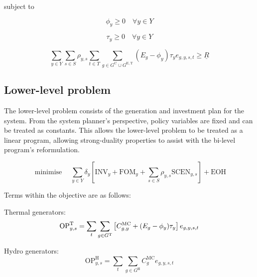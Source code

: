 \documentclass{article}
\newcommand{\sGeneratorsExistingThermal}{G^{\mathrm{E,T}}}
\newcommand{\sGeneratorsCandidate}{G^{\mathrm{C}}}
\newcommand{\sGeneratorsThermal}{G^{\mathrm{T}}}
\newcommand{\sGeneratorsHydro}{G^{\mathrm{H}}}
\newcommand{\sYears}{Y}
\newcommand{\sScenarios}{S}
\newcommand{\sIntervals}{T}
\newcommand{\iGenerator}{g}
\newcommand{\iYear}{y}
\newcommand{\iScenario}{s}
\newcommand{\iInterval}{t}
\newcommand{\cOperatingCostThermal}[1][\iYear,\iScenario]{\mathrm{OP}^{\mathrm{T}}_{#1}}
\newcommand{\cOperatingCostHydro}[1][\iYear,\iScenario]{\mathrm{OP}^{\mathrm{H}}_{#1}}
\newcommand{\cFixedOperationsMaintenanceCost}[1][\iYear]{\mathrm{FOM}_{#1}}
\newcommand{\cScenarioDuration}[1][\iYear,\iScenario]{\rho_{#1}}
\newcommand{\cMarginalCost}[1][\iGenerator,\iYear]{C^{\mathrm{MC}}_{#1}}
\newcommand{\cEmissionsIntensity}[1][\iGenerator]{E_{#1}}
\newcommand{\cInvestmentCost}[1][\iYear]{\mathrm{INV}_{#1}}
\newcommand{\cOperatingCostScenario}[1][\iYear,\iScenario]{\mathrm{SCEN}_{#1}}
\newcommand{\cDiscountRate}[1][\iYear]{\delta_{#1}}
\newcommand{\vBaseline}[1][\iYear]{\phi_{#1}}
\newcommand{\vPermitPrice}[1][\iYear]{\tau_{#1}}
\newcommand{\vEnergy}[1][\iGenerator,\iYear,\iScenario,\iInterval]{e_{#1}}
\newcommand{\cMinimumSchemeRevenue}{\underline{R}}
\newcommand{\cEndOfHorizonCost}{\textrm{EOH}}
\DeclareMathOperator*{\minimise}{minimise}
\begin{document}
subject to

\begin{equation}
	\vBaseline \geq 0 \quad \forall \iYear \in \sYears
\end{equation}

\begin{equation}
	\vPermitPrice \geq 0 \quad \forall \iYear \in \sYears
\end{equation}

\begin{equation}
	\sum\limits_{\iYear \in \sYears} \sum\limits_{\iScenario \in \sScenarios} \cScenarioDuration \sum\limits_{\iInterval \in \sIntervals} \sum\limits_{\iGenerator \in \sGeneratorsCandidate \cup \sGeneratorsExistingThermal}\left(\cEmissionsIntensity -\vBaseline\right)\vPermitPrice \vEnergy \geq \cMinimumSchemeRevenue
\end{equation}

\subsection{Lower-level problem}
The lower-level problem consists of the generation and investment plan for the system. From the system planner's perspective, policy variables are fixed and can be treated as constants. This allows the lower-level problem to be treated as a linear program, allowing strong-duality properties to assist with the bi-level program's reformulation.

\begin{equation}
	\minimise \quad \sum\limits_{\iYear\in\sYears} \cDiscountRate \left[\cInvestmentCost + \cFixedOperationsMaintenanceCost + \sum\limits_{\iScenario \in \sScenarios} \cScenarioDuration \cOperatingCostScenario \right] + \cEndOfHorizonCost
\end{equation}

Terms within the objective are as follows:

Thermal generators:
\begin{equation}
	\cOperatingCostThermal = \sum\limits_{\iInterval} \sum\limits_{\iGenerator \in \sGeneratorsThermal} \left[\cMarginalCost + (\cEmissionsIntensity - \vBaseline)\vPermitPrice\right]\vEnergy\\
\end{equation}

Hydro generators:
\begin{equation}
	\cOperatingCostHydro = \sum\limits_{\iInterval}\sum\limits_{\iGenerator \in \sGeneratorsHydro}\cMarginalCost[\iGenerator] \vEnergy
\end{equation}
\end{document}
